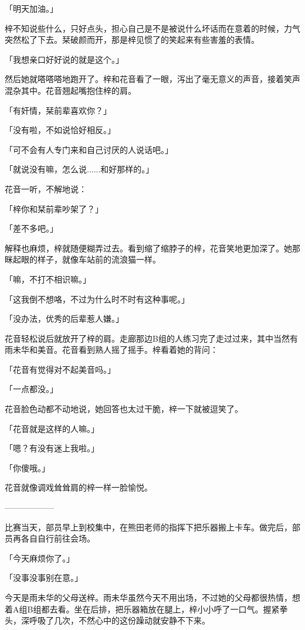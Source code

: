 \documentclass[UTF8]{ctexart}
\begin{document}
    「明天加油。」

    梓不知说些什么，只好点头，担心自己是不是被说什么坏话而在意着的时候，力气突然松了下去。栞破颜而开，那是梓见惯了的笑起来有些害羞的表情。

    「我想亲口好好说的就是这个。」

    然后她就嗒嗒嗒地跑开了。梓和花音看了一眼，泻出了毫无意义的声音，接着笑声混杂其中。花音翘起嘴抱住梓的肩。

    「有奸情，栞前辈喜欢你？」

    「没有啦，不如说恰好相反。」

    「可不会有人专门来和自己讨厌的人说话吧。」

    「就说没有嘛，怎么说......和好那样的。」

    花音一听，不解地说：

    「梓你和栞前辈吵架了？」

    「差不多吧。」

    解释也麻烦，梓就随便糊弄过去。看到缩了缩脖子的梓，花音笑地更加深了。她那眯起眼的样子，就像车站前的流浪猫一样。

    「嘛，不打不相识嘛。」

    「这我倒不想咯，不过为什么时不时有这种事呢。」

    「没办法，优秀的后辈惹人嫌。」

    花音轻松说后就放开了梓的肩。走廊那边B组的人练习完了走过过来，其中当然有雨未华和美音。花音看到熟人摇了摇手。梓看着她的背问：

    「花音有觉得对不起美音吗。」

    「一点都没。」

    花音脸色动都不动地说，她回答也太过干脆，梓一下就被逗笑了。

    「花音就是这样的人嘛。」

    「嗯？有没有迷上我啦。」

    「你傻哦。」

    花音就像调戏耸耸肩的梓一样一脸愉悦。

    ——————

    比赛当天，部员早上到校集中，在熊田老师的指挥下把乐器搬上卡车。做完后，部员再各自自行前往会场。

    「今天麻烦你了。」

    「没事没事别在意。」

    今天是雨未华的父母送梓。雨未华虽然今天不用出场，不过她的父母都很热情，想着A组B组都去看。坐在后排，把乐器箱放在腿上，梓小小呼了一口气。握紧拳头，深呼吸了几次，不然心中的这份躁动就安静不下来。
\end{document}
